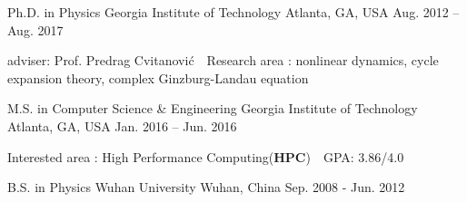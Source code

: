 


\begin{cventries}

\cveducation
{Ph.D. in Physics}
{Georgia Institute of Technology}
{Atlanta, GA, USA}
{Aug. 2012 -- Aug. 2017}
{
  \begin{cvitems}
    \item adviser: Prof. Predrag Cvitanovi\'c \quad \quad 
    \bullet \,\, Research area : nonlinear dynamics, cycle expansion theory,
      complex Ginzburg-Landau equation
  \end{cvitems}
}


\cveducation
{M.S. in Computer Science \& Engineering }
{Georgia Institute of Technology}
{Atlanta, GA, USA}
{Jan. 2016 -- Jun. 2016}
{
  \begin{cvitems}
    \item Interested area : High Performance Computing(\textbf{HPC}) 
      \quad \quad \bullet \,\, GPA: 3.86/4.0
  \end{cvitems}
}

\cveducation
{B.S. in Physics} %
{Wuhan University} %
{Wuhan, China} %
{Sep. 2008 - Jun. 2012} %
{    
}
\vspace{-1em}



\end{cventries}
